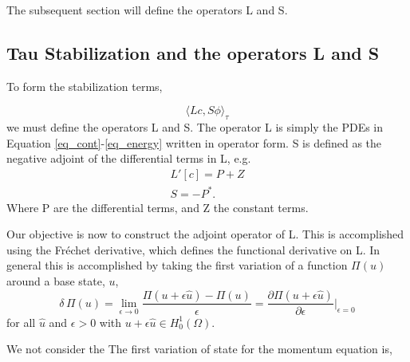 \documentclass{article}
\begin{document}
The subsequent section will define the operators L and S. 

%
%
\subsection{Tau Stabilization and the operators L and S}


To form the stabilization terms, 

\begin{equation}
 \langle Lc,S\phi \rangle_\tau
\end{equation}
we must define the operators L and S. The operator L is simply the PDEs
in Equation \ref{eq_cont}-\ref{eq_energy} written in operator form. S is
defined as the negative adjoint of the differential terms in L, e.g.
\begin{align}
 L'[c] = P + Z \\
 S = -P^*. 
\end{align}
Where P are the differential terms, and Z the constant terms. 

Our objective is now to construct the adjoint operator of L. This is
accomplished using the Fr\'echet derivative, which defines the
functional derivative on L. In general this is accomplished by taking
the first variation of a function $\Pi(u)$ around a base state, $u$,
\begin{equation}
 \delta\, \Pi(u) = \lim_{\epsilon \to 0} \frac{\Pi(u+\epsilon \hat u) -
  \Pi(u)}{\epsilon} =
  \frac{\partial \Pi(u +\epsilon \hat u)}{\partial \epsilon}
  \bigg|_{\epsilon = 0}
\end{equation}
for all $\hat u$ and $\epsilon > 0$ with $u + \epsilon \hat u \in
H^1_0(\Omega)$.

We not consider the 
The first variation of state for the
momentum equation is, 

\end{document}
